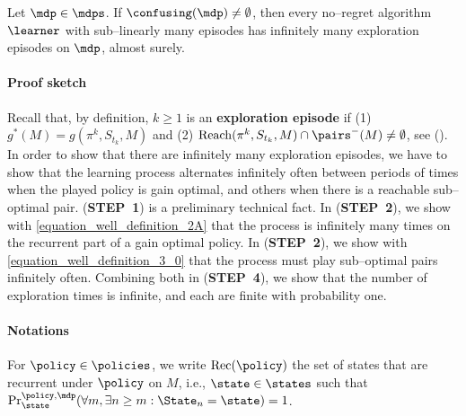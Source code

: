 \documentclass[preprint,cleveref,12pt]{colt2025}
\def\model{\mdp}
\def\models{\mdps}
\def\Reach{\mathrm{Reach}}
\def\STEP#1{(\strong{STEP~#1})}
\newcommand{\strong}[1]{\textbf{#1}}
\begin{document}
    \begin{proposition}
    \label{proposition_well_defined}
        Let $\model \in \models$.
        If $\confusing(\model) \ne \emptyset$, then every no--regret algorithm $\learner$ with sub--linearly many episodes has infinitely many exploration episodes on $\model$, almost surely. 
    \end{proposition}

    \paragraph{Proof sketch}
    Recall that, by definition, $k \ge 1$ is an \strong{exploration episode} if (1) $g^*(M) = g(\pi^k, S_{t_k}, M)$ and (2) $\Reach(\pi^k, S_{t_k}, M) \cap \pairs^-(M) \ne \emptyset$, see ().
    In order to show that there are infinitely many exploration episodes, we have to show that the learning process alternates infinitely often between periods of times when the played policy is gain optimal, and others when there is a reachable sub--optimal pair.
    \STEP{1} is a preliminary technical fact.
    In \STEP{2}, we show with \eqref{equation_well_definition_2A} that the process is infinitely many times on the recurrent part of a gain optimal policy.
    In \STEP{2}, we show with \eqref{equation_well_definition_3_0} that the process must play sub--optimal pairs infinitely often.
    Combining both in \STEP{4}, we show that the number of exploration times is infinite, and each are finite with probability one.

    \paragraph{Notations}
    For $\policy \in \policies$, we write $\mathrm{Rec}(\policy)$ the set of states that are recurrent under $\policy$ on $M$, i.e., $\state \in \states$ such that $\Pr_{\state}^{\policy, \model}(\forall m, \exists n \ge m: \State_n = \state) = 1$.
\end{document}
